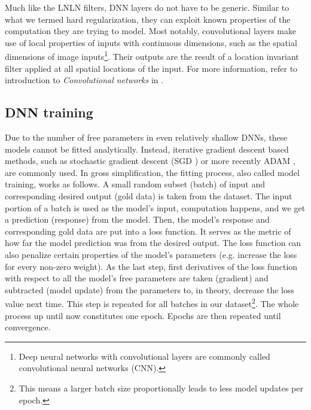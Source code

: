 
Much like the LNLN filters, DNN layers do not have to be generic. Similar to what we termed hard regularization, they can exploit known properties of the computation they are trying to model. Most notably, convolutional layers make use of local properties of inputs with continuous dimensions, such as the spatial dimensions of image inputs\footnote{Deep neural networks with convolutional layers are commonly called convolutional neural networks (CNN).}. Their outputs are the result of a location invariant filter applied at all spatial locations of the input. For more information, refer to introduction to \textit{Convolutional networks} in \cite{thesis_hojdar}.

\subsection{DNN training}\label{ch:1.3.2}

Due to the number of free parameters in even relatively shallow DNNs, these models cannot be fitted analytically. Instead, iterative gradient descent based methods, such as stochastic gradient descent (SGD \citep{kiefer1952}) or more recently ADAM \citep{kingma2014adam}, are commonly used. In gross simplification, the fitting process, also called model training, works as follows. A small random subset (batch) of input and corresponding desired output (gold data) is taken from the dataset. The input portion of a batch is used as the model’s input, computation happens, and we get a prediction (response) from the model. Then, the model’s response and corresponding gold data are put into a loss function. It serves as the metric of how far the model prediction was from the desired output. The loss function can also penalize certain properties of the model’s parameters (e.g. increase the loss for every non-zero weight). As the last step, first derivatives of the loss function with respect to all the model’s free parameters are taken (gradient) and subtracted (model update) from the parameters to, in theory, decrease the loss value next time. This step is repeated for all batches in our dataset\footnote{This means a larger batch size proportionally leads to less model updates per epoch.}. The whole process up until now constitutes one epoch. Epochs are then repeated until convergence.

